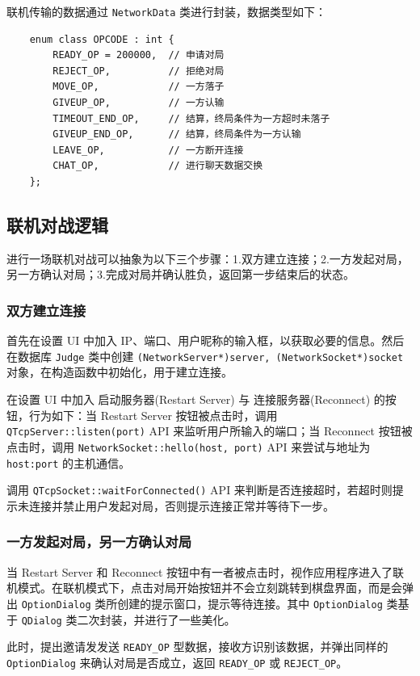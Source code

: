 \documentclass{noithesis}
\begin{document}
	联机传输的数据通过 \verb|NetworkData| 类进行封装，数据类型如下：
	\begin{lstlisting}
	enum class OPCODE : int {
    	READY_OP = 200000,  // 申请对局
    	REJECT_OP,          // 拒绝对局
	    MOVE_OP,            // 一方落子
	    GIVEUP_OP,          // 一方认输
	    TIMEOUT_END_OP,     // 结算，终局条件为一方超时未落子
	    GIVEUP_END_OP,      // 结算，终局条件为一方认输
	    LEAVE_OP,           // 一方断开连接
	    CHAT_OP,            // 进行聊天数据交换
	};
	\end{lstlisting}

    \subsection{联机对战逻辑}
    
    进行一场联机对战可以抽象为以下三个步骤：1.双方建立连接；2.一方发起对局，另一方确认对局；3.完成对局并确认胜负，返回第一步结束后的状态。
	
	\subsubsection{双方建立连接}
	
	首先在设置 UI 中加入 IP、端口、用户昵称的输入框，以获取必要的信息。然后在数据库 \verb|Judge| 类中创建 \verb|(NetworkServer*)server, (NetworkSocket*)socket| 对象，在构造函数中初始化，用于建立连接。
	
	在设置 UI 中加入 启动服务器(Restart Server) 与 连接服务器(Reconnect) 的按钮，行为如下：当 Restart Server 按钮被点击时，调用 \verb|QTcpServer::listen(port)| API 来监听用户所输入的端口；当 Reconnect 按钮被点击时，调用 \verb|NetworkSocket::hello(host, port)| API 来尝试与地址为 \verb|host:port| 的主机通信。
	
	调用 \verb|QTcpSocket::waitForConnected()| API 来判断是否连接超时，若超时则提示未连接并禁止用户发起对局，否则提示连接正常并等待下一步。
	
	\subsubsection{一方发起对局，另一方确认对局}
	
	当 Restart Server 和 Reconnect 按钮中有一者被点击时，视作应用程序进入了联机模式。在联机模式下，点击对局开始按钮并不会立刻跳转到棋盘界面，而是会弹出 \verb|OptionDialog| 类所创建的提示窗口，提示等待连接。其中 \verb|OptionDialog| 类基于 \verb|QDialog| 类二次封装，并进行了一些美化。
	
	此时，提出邀请发发送 \verb|READY_OP| 型数据，接收方识别该数据，并弹出同样的 \verb|OptionDialog| 来确认对局是否成立，返回 \verb|READY_OP| 或 \verb|REJECT_OP|。
	
\end{document}
